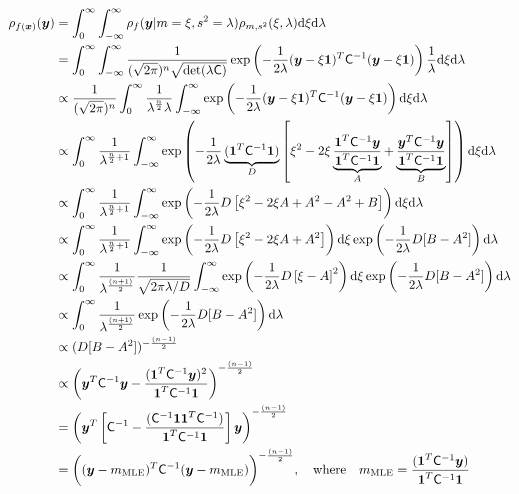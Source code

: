 \documentclass{iitthesis}          %
\newcommand{\bm}[1]{\boldsymbol{#1}}
\newcommand{\dif}[1]{\text{d}{#1}}
\newcommand{\vx}{\bm{x}}
\newcommand{\vy}{\bm{y}}
\newcommand{\vone}{\bm{1}}
\newcommand{\mC}{\mathsf{C}}
\newcommand{\mCInv}{{\mathsf{C}^{-1}}}
\newcommand{\MLE}{\textup{MLE}}
\begin{document}
{{{{{{\begin{align*}
\rho_{f(\vx)}(\vy) &=\int_{0}^\infty \int_{-\infty}^\infty \rho_{f} (\vy | m=\xi, s^2=\lambda) 
\rho_{m,s^2} (\xi, \lambda) \dif{\xi} \dif{\lambda} 
\\
&= \int_{0}^\infty \int_{-\infty}^\infty \frac{1}{(\sqrt{2 \pi})^n \sqrt{\det(\lambda \mC)}} 
\exp \left( -\frac{1}{2\lambda} (\vy - \xi \vone)^T\mCInv (\vy- \xi\vone)\right) \frac{1}{\lambda} \dif{\xi} \dif{\lambda}
\\
& \propto \frac{1}{(\sqrt{2 \pi})^n} \int_{0}^\infty \frac{1}{\lambda ^{\frac n2} \lambda}
\int_{-\infty}^\infty \exp \left( -\frac{1}{2\lambda} (\vy - \xi \vone)^T\mCInv (\vy- \xi\vone)\right)  \dif{\xi} \dif{\lambda}
\\
& \propto \int_{0}^\infty \frac{1}{\lambda^{\frac n2 + 1}}
\int_{-\infty}^\infty \exp \left( -\frac{1}{2\lambda} 
\underbrace{(\vone^T \mCInv \vone)}_{D}
\left[
\xi^2 -2 \xi \underbrace{\frac{\vone^T \mCInv \vy }{\vone^T \mCInv \vone}}_{A} + \underbrace{\frac{\vy^T \mCInv \vy }{\vone^T \mCInv \vone}}_{B} 
\right]
\right)  \dif{\xi} \dif{\lambda}
\\
& \propto \int_{0}^\infty \frac{1}{\lambda^{\frac n2 + 1}}
\int_{-\infty}^\infty \exp \left( -\frac{1}{2\lambda} D
\left[
\xi^2 -2 \xi A + A^2 - A^2 + B
\right]
\right)  \dif{\xi} \dif{\lambda}
\\
& \propto \int_{0}^\infty \frac{1}{\lambda^{\frac n2 + 1}}
\int_{-\infty}^\infty \exp \left( -\frac{1}{2\lambda} D
\left[
\xi^2 -2 \xi A + A^2
\right]
\right) \dif{\xi}
\exp \left(  - \frac{1}{2\lambda} D [B - A^2] \right)
\dif{\lambda}
\\
& \propto \int_{0}^\infty \frac{1}{\lambda^{\frac{(n+1)}{2}}}
\frac{1}{\sqrt{2\pi\lambda/D}}
\int_{-\infty}^\infty \exp \left( -\frac{1}{2\lambda} D
\left[
\xi-A
\right]^2
\right) \dif{\xi}
\exp \left(  - \frac{1}{2\lambda} D [B - A^2] \right)
\dif{\lambda}
\\
& \propto \int_{0}^\infty \frac{1}{\lambda^{\frac{(n+1)}{2}}}
\exp \left(  - \frac{1}{2\lambda} D [B - A^2] \right)
\dif{\lambda}
\\
& \propto (D[B-A^2])^{-\frac{(n-1)}{2}}
\\
& \propto \left(\vy^T\mCInv\vy - \frac{(\vone^T\mCInv\vy)^2}{\vone^T\mCInv\vone} \right)^{-\frac{(n-1)}{2}}
\\
&=  \left(\vy^T \left[\mCInv - \frac{(\mCInv\vone \vone^T \mCInv)}{\vone^T\mCInv\vone} \right]\vy \right)^{-\frac{(n-1)}{2}}
\\
&=  \biggl((\vy-m_\MLE)^T \mCInv (\vy-m_\MLE) \biggr)^{-\frac{(n-1)}{2}}, 
\quad \text{where} \quad
m_\MLE=\frac{(\vone^T \mCInv \vy)}{\vone^T\mCInv\vone}
\end{align*}

}}}}}}
\end{document}
